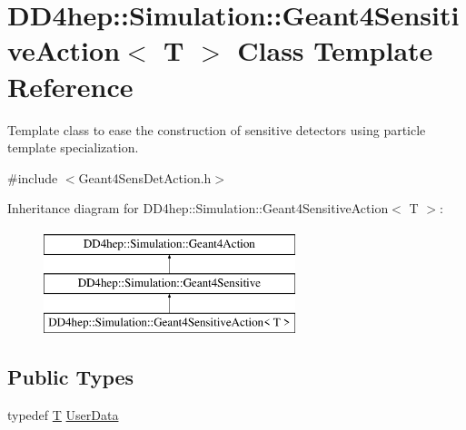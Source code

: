 \hypertarget{class_d_d4hep_1_1_simulation_1_1_geant4_sensitive_action}{}\section{D\+D4hep\+:\+:Simulation\+:\+:Geant4\+Sensitive\+Action$<$ T $>$ Class Template Reference}
\label{class_d_d4hep_1_1_simulation_1_1_geant4_sensitive_action}


Template class to ease the construction of sensitive detectors using particle template specialization.  




{\ttfamily \#include $<$Geant4\+Sens\+Det\+Action.\+h$>$}

Inheritance diagram for D\+D4hep\+:\+:Simulation\+:\+:Geant4\+Sensitive\+Action$<$ T $>$\+:\begin{figure}[H]
\begin{center}
\leavevmode
\includegraphics[height=3.000000cm]{class_d_d4hep_1_1_simulation_1_1_geant4_sensitive_action}
\end{center}
\end{figure}
\subsection*{Public Types}
\begin{DoxyCompactItemize}
\item 
typedef \hyperlink{class_t}{T} \hyperlink{class_d_d4hep_1_1_simulation_1_1_geant4_sensitive_action_a1aa349c02363cf7471a043ad5f3b95c9}{User\+Data}
\end{DoxyCompactItemize}
